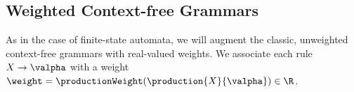 

    

\subsection{Weighted Context-free Grammars}

As in the case of finite-state automata, we will augment the classic, unweighted context-free grammars with real-valued weights.
We associate each rule $X \rightarrow \valpha$ with a weight $\weight=\productionWeight(\production{X}{\valpha})\in\R$.

